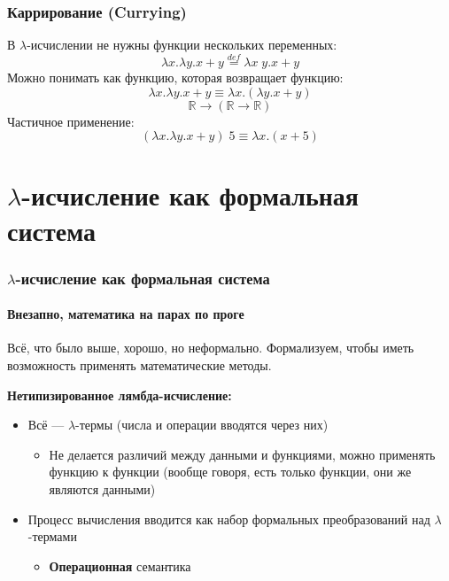 \documentclass{../../slides-style}
\begin{document}
    \begin{frame}
        \frametitle{Каррирование (Currying)}
        В $\lambda$-исчислении не нужны функции нескольких переменных:
        $$\lambda x.\lambda y.x + y \stackrel{def}{=} \lambda x \; y.x + y$$
        Можно понимать как функцию, которая возвращает функцию:
        $$\lambda x.\lambda y.x + y \equiv \lambda x.(\lambda y.x + y)$$
        $$\mathbb{R} \rightarrow (\mathbb{R} \rightarrow \mathbb{R})$$
        Частичное применение:
        $$(\lambda x.\lambda y.x + y) \; 5 \equiv \lambda x.(x + 5)$$
    \end{frame}
    
    \section{$\lambda$-исчисление как формальная система}
        
    \begin{frame}
        \frametitle{$\lambda$-исчисление как формальная система}
        \framesubtitle{Внезапно, математика на парах по проге}
        Всё, что было выше, хорошо, но неформально. Формализуем, чтобы иметь возможность
        применять математические методы.
        
        \textbf{Нетипизированное лямбда-исчисление:}
        \begin{itemize}
            \item Всё --- $\lambda$-термы (числа и операции вводятся через них)
            \begin{itemize}
                \item Не делается различий между данными и функциями, можно применять 
                        функцию к функции (вообще говоря, есть только функции, они же являются данными)
            \end{itemize}
            \item Процесс вычисления вводится как набор формальных преобразований над
                    $\lambda$-термами
            \begin{itemize}
                \item \textbf{Операционная} семантика
            \end{itemize}
        \end{itemize}
    \end{frame}
\end{document}
